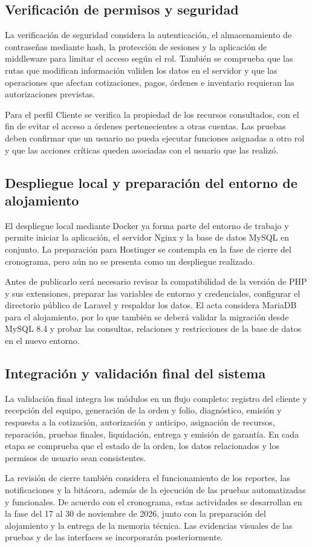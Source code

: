 \subsection{Verificación de permisos y seguridad}

La verificación de seguridad considera la autenticación, el almacenamiento de contraseñas mediante hash, la protección de sesiones y la aplicación de middleware para limitar el acceso según el rol. También se comprueba que las rutas que modifican información validen los datos en el servidor y que las operaciones que afectan cotizaciones, pagos, órdenes e inventario requieran las autorizaciones previstas.

Para el perfil Cliente se verifica la propiedad de los recursos consultados, con el fin de evitar el acceso a órdenes pertenecientes a otras cuentas. Las pruebas deben confirmar que un usuario no pueda ejecutar funciones asignadas a otro rol y que las acciones críticas queden asociadas con el usuario que las realizó.

\subsection{Despliegue local y preparación del entorno de alojamiento}

El despliegue local mediante Docker ya forma parte del entorno de trabajo y permite iniciar la aplicación, el servidor Nginx y la base de datos MySQL en conjunto. La preparación para Hostinger se contempla en la fase de cierre del cronograma, pero aún no se presenta como un despliegue realizado.

Antes de publicarlo será necesario revisar la compatibilidad de la versión de PHP y sus extensiones, preparar las variables de entorno y credenciales, configurar el directorio público de Laravel y respaldar los datos. El acta considera MariaDB para el alojamiento, por lo que también se deberá validar la migración desde MySQL 8.4 y probar las consultas, relaciones y restricciones de la base de datos en el nuevo entorno.

\subsection{Integración y validación final del sistema}

La validación final integra los módulos en un flujo completo: registro del cliente y recepción del equipo, generación de la orden y folio, diagnóstico, emisión y respuesta a la cotización, autorización y anticipo, asignación de recursos, reparación, pruebas finales, liquidación, entrega y emisión de garantía. En cada etapa se comprueba que el estado de la orden, los datos relacionados y los permisos de usuario sean consistentes.

La revisión de cierre también considera el funcionamiento de los reportes, las notificaciones y la bitácora, además de la ejecución de las pruebas automatizadas y funcionales. De acuerdo con el cronograma, estas actividades se desarrollan en la fase del 17 al 30 de noviembre de 2026, junto con la preparación del alojamiento y la entrega de la memoria técnica. Las evidencias visuales de las pruebas y de las interfaces se incorporarán posteriormente.
